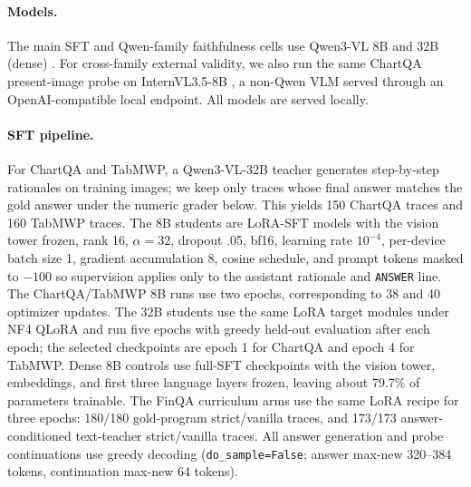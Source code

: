 \documentclass[11pt]{article}
\begin{document}
\paragraph{Models.}
The main SFT and Qwen-family faithfulness cells use Qwen3-VL 8B and 32B (dense) \citep{qwen3vl}. For cross-family external validity, we also run the same ChartQA present-image probe on InternVL3.5-8B \citep{internvl35}, a non-Qwen VLM served through an OpenAI-compatible local endpoint. All models are served locally.

\paragraph{SFT pipeline.}
For ChartQA and TabMWP, a Qwen3-VL-32B teacher generates step-by-step rationales on training images; we keep only traces whose final answer matches the gold answer under the numeric grader below. This yields 150 ChartQA traces and 160 TabMWP traces. The 8B students are LoRA-SFT models with the vision tower frozen, rank 16, $\alpha{=}32$, dropout .05, bf16, learning rate $10^{-4}$, per-device batch size 1, gradient accumulation 8, cosine schedule, and prompt tokens masked to $-100$ so supervision applies only to the assistant rationale and \texttt{ANSWER} line. The ChartQA/TabMWP 8B runs use two epochs, corresponding to 38 and 40 optimizer updates. The 32B students use the same LoRA target modules under NF4 QLoRA and run five epochs with greedy held-out evaluation after each epoch; the selected checkpoints are epoch 1 for ChartQA and epoch 4 for TabMWP. Dense 8B controls use full-SFT checkpoints with the vision tower, embeddings, and first three language layers frozen, leaving about 79.7\% of parameters trainable. The FinQA curriculum arms use the same LoRA recipe for three epochs: 180/180 gold-program strict/vanilla traces, and 173/173 answer-conditioned text-teacher strict/vanilla traces. All answer generation and probe continuations use greedy decoding (\texttt{do\_sample=False}; answer max-new 320--384 tokens, continuation max-new 64 tokens).
\end{document}
